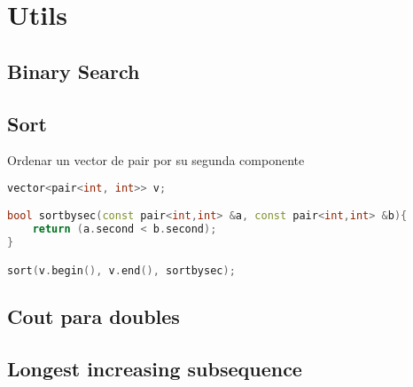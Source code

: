 \section{Utils}

\subsection{Binary Search}


\subsection{Sort}
Ordenar un vector de pair por su segunda componente
\begin{lstlisting}[language=C++]
vector<pair<int, int>> v;

bool sortbysec(const pair<int,int> &a, const pair<int,int> &b){
	return (a.second < b.second);
}

sort(v.begin(), v.end(), sortbysec);
\end{lstlisting}
\subsection{Cout para doubles}

\subsection{Longest increasing subsequence}

\newpage
